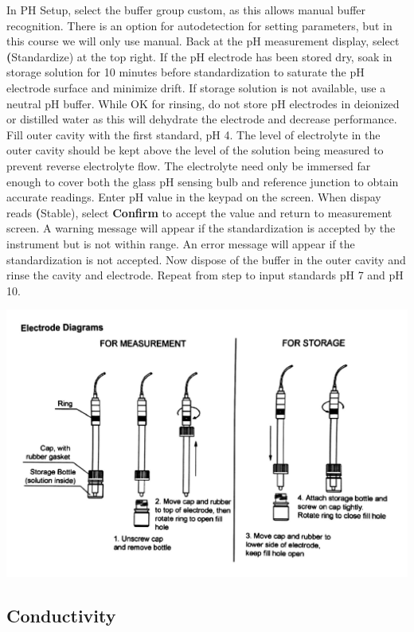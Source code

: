 \documentclass[12pt]{../SOP3_beta}\usepackage[]{graphicx}\usepackage[]{color}
\begin{document}
\NP In PH Setup, select the buffer group custom, as this allows manual buffer recognition. There is an option for autodetection for setting parameters, but in this course we will only use manual.
\NP Back at the pH measurement display, select \textbf(Standardize) at the top right.
\NP If the pH electrode has been stored dry, soak in storage solution for 10 minutes before standardization to saturate the pH electrode surface and minimize drift. If storage solution is not available, use a neutral pH buffer. While OK for rinsing, do not store pH electrodes in deionized or distilled water as this will dehydrate the electrode and decrease performance. 
\NP Fill outer cavity with the first standard, pH 4. The level of electrolyte in the outer cavity should be kept above the level of the solution being measured to prevent reverse electrolyte flow. The electrolyte need only be immersed far enough to cover both the glass pH sensing bulb and reference junction to obtain accurate readings.
\NP Enter pH value in the keypad on the screen.
\NP When dispay reads \textbf(Stable), select \textbf{Confirm} to accept the value and return to measurement screen. A warning message will appear if the standardization is accepted by the instrument but is not within range. An error message will appear if the standardization is not accepted.
\NP Now dispose of the buffer in the outer cavity and rinse the cavity and electrode. Repeat from step  to input standards pH 7 and pH 10.

\NP\includegraphics[scale=.25]{Electrode.png}

\subsection{Conductivity}
\end{document}

